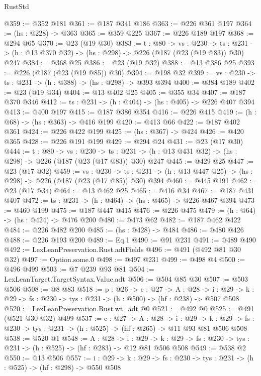 \begin{lexlean}{RustStd}
\begin{coremodule}
@359 := @352 @181
@361 := @187 @341 @186
@363 := @226 @361 @197
@364 := (hs : @228) -> @363
@365 := @359 @225
@367 := @226 @189 @197
@368 := @294 @65
@370 := @23 (@19 @30)
@383 := {t : @80} ->
  {vs : @230} ->
  {ts : @231} -> (h : @13 @370 @32) -> (hs : @298) -> @226 (@187 (@23 (@19 @83)) @30) @247
@384 := @368 @25
@386 := @23 (@19 @32)
@388 := @13 @386 @25
@393 := @226 (@187 (@23 (@19 @85)) @30)
@394 := @198 @32
@399 := {vs : @230} -> {ts : @231} -> (h : @388) -> (hs : @298) -> @393 @394
@400 := @384 @189
@402 := @23 (@19 @34)
@404 := @13 @402 @25
@405 := @355 @34
@407 := @187 @370 @346
@412 := {ts : @231} -> (h : @404) -> (hs : @405) -> @226 @407 @394
@413 := @400 @197
@415 := @187 @386 @354
@416 := @226 @415
@419 := (h : @68) -> (hs : @363) -> @416 @199
@420 := @413 @66
@422 := @187 @402 @361
@424 := @226 @422 @199
@425 := (hs : @367) -> @424
@426 := @420 @365
@428 := @226 @191 @199
@429 := @294 @24
@431 := @23 (@17 @30)
@444 := {t : @80} ->
  {vs : @230} ->
  {ts : @231} -> (h : @13 @431 @32) -> (hs : @298) -> @226 (@187 (@23 (@17 @83)) @30) @247
@445 := @429 @25
@447 := @23 (@17 @32)
@459 := {vs : @230} ->
  {ts : @231} -> (h : @13 @447 @25) -> (hs : @298) -> @226 (@187 (@23 (@17 @85)) @30) @394
@460 := @445 @191
@462 := @23 (@17 @34)
@464 := @13 @462 @25
@465 := @416 @34
@467 := @187 @431 @407
@472 := {ts : @231} -> (h : @464) -> (hs : @465) -> @226 @467 @394
@473 := @460 @199
@475 := @187 @447 @415
@476 := @226 @475
@479 := (h : @64) -> (hs : @424) -> @476 @200
@480 := @473 @62
@482 := @187 @462 @422
@484 := @226 @482 @200
@485 := (hs : @428) -> @484
@486 := @480 @426
@488 := @226 @193 @200
@489 := Eq.{1}
@490 := @91 @231
@491 := @489 @490
@492 := LexLeanPreservation.Rust.adtFields
@496 := @491 (@492 @81 @30 @32)
@497 := Option.some.{0}
@498 := @497 @231
@499 := @498 @4
@500 := @496 @499
@503 := @7 @239 @93 @81
@504 := LexLeanTarget.TargetSyntax.Value.adt
@506 := @504 @85 @30
@507 := @503 @506
@508 := @8 @83
@518 := {p : @26} ->
  {c : @27} ->
  {A : @28} ->
  {i : @29} -> {k : @29} -> {fs : @230} -> {tys : @231} -> (h : @500) -> (hf : @238) -> @507 @508
@520 := LexLeanPreservation.Rust.wt_adt @0
@521 := @492 @0
@525 := @491 (@521 @30 @32) @499
@537 := {c : @27} ->
  {A : @28} ->
  {i : @29} ->
  {k : @29} -> {fs : @230} -> {tys : @231} -> (h : @525) -> (hf : @265) -> @11 @93 @81 @506 @508
@538 := @520 @1
@548 := {A : @28} ->
  {i : @29} ->
  {k : @29} -> {fs : @230} -> {tys : @231} -> (h : @525) -> (hf : @283) -> @12 @81 @506 @508
@549 := @538 @2
@550 := @13 @506
@557 := {i : @29} ->
  {k : @29} -> {fs : @230} -> {tys : @231} -> (h : @525) -> (hf : @298) -> @550 @508

\end{coremodule}
\end{lexlean}

